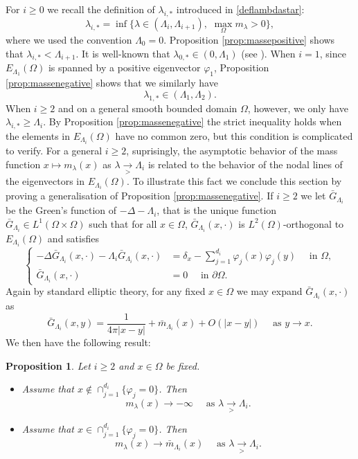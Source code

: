 \documentclass[10pt]{amsart}
\numberwithin{equation}{section}
\newcommand{\vp}{\varphi}
\newcommand{\Om}{\Omega}
\theoremstyle{plain}
\newtheorem{prop}{Proposition}[section]%
\theoremstyle{remark}
\begin{document}
For $i \ge 0$ we recall the definition of $\lambda_{i,*}$ introduced in \eqref{deflambdastar}:
$$ \lambda_{i,*}= \inf \big \{ \lambda \in (\Lambda_i, \Lambda_{i+1}), \, \,  \max_{\Om} m_\lambda >0 \big \}, $$
where we used the convention $\Lambda_0 = 0$. Proposition \ref{prop:massepositive} shows that $\lambda_{i,*} < \Lambda_{i+1}$. It is well-known that $\lambda_{0,*} \in (0, \Lambda_1)$ (see \cite[Equation (1.51)]{BN}). When $i=1$, since $E_{\Lambda_1}(\Om)$ is spanned by a positive eigenvector $\vp_1$, Proposition \ref{prop:massenegative} shows that we similarly have 
\begin{equation} \label{lambda:star:1} \lambda_{1,*} \in (\Lambda_1, \Lambda_2). \end{equation}
When $i \ge 2$ and on a general smooth bounded domain $\Om$, however, we only have $\lambda_{i,*} \ge \Lambda_i$. By Proposition \ref{prop:massenegative} the strict inequality holds when the elements in $E_{\Lambda_i}(\Om)$ have no common zero, but this condition is complicated to verify. For a general $i \ge 2$, suprisingly, the asymptotic behavior of the mass function $x \mapsto m_\lambda(x)$ as $\lambda \underset{> }{\to} \Lambda_{i}$ is related to the behavior of the nodal lines of the eigenvectors in $E_{\Lambda_i}(\Om)$. To illustrate this fact we conclude this section by proving a generalisation of Proposition \ref{prop:massenegative}. If $i \ge 2$ we let $\bar{G}_{\Lambda_i}$ be the Green's function of $- \Delta - \Lambda_i$, that is the unique function $\bar{G}_{\Lambda_i} \in L^1(\Om \times \Om)$ such that for all $x \in \Om$, $\bar{G}_{\Lambda_i} (x, \cdot)$ is $L^2(\Om)$-orthogonal to $E_{\Lambda_i}(\Om)$ and satisfies
\begin{equation} \label{eq:Glambda:;noyau}
\left \{\begin{aligned}
- \Delta \bar{G}_{\Lambda_i}(x, \cdot) - \Lambda_i \bar{G}_{\Lambda_i}(x, \cdot) &= \delta_x -  \sum_{j=1}^{d_i} \vp_j(x) \vp_j(y)  \quad \text{ in } \Om, \\
  \bar{G}_{\Lambda_i}(x, \cdot) & = 0 \quad \text{ in } \partial \Om.
\end{aligned} \right.
\end{equation}
Again by standard elliptic theory, for any fixed $x \in \Om$ we may expand $\bar{G}_{\Lambda_i}(x, \cdot)$ as 
$$ \bar{G}_{\Lambda_i}(x, y) = \frac{1}{4 \pi |x-y|} + \bar{m}_{\Lambda_i}(x) + O(|x-y|) \quad \text{ as } y \to x. $$
We then have the following result:

  \begin{prop} \label{prop:comportement:masse}
Let $i \ge 2$ and $x \in \Om$ be fixed. 

\begin{itemize}
\item Assume that $ x \not \in \cap_{j=1}^{d_i} \{\vp_j = 0 \} $. Then
$$ m_\lambda(x) \to - \infty \quad \text{ as } \lambda \underset{> }{\to} \Lambda_{i} . $$
\item Assume that $ x \in \cap_{j=1}^{d_i} \{\vp_j = 0 \} $. Then 
$$ m_{\lambda}(x) \to  \bar{m}_{\Lambda_i}(x) \quad \text{ as } \lambda \underset{> }{\to} \Lambda_{i}. $$
\end{itemize}
\end{prop}
\end{document}

